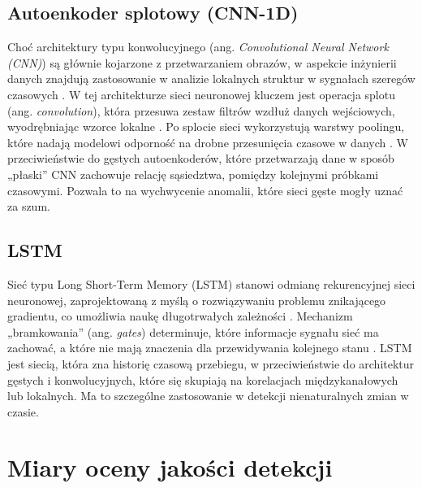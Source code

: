 \documentclass[a4paper,twoside,12pt]{book}
\begin{document}
	\subsection{Autoenkoder splotowy (CNN-1D)}
	Choć architektury typu konwolucyjnego  (ang. \textit{Convolutional Neural Network (CNN)}) są głównie kojarzone z przetwarzaniem obrazów, w aspekcie inżynierii danych znajdują zastosowanie w analizie lokalnych struktur w sygnałach szeregów czasowych \cite{kwon2018empirical}. W tej architekturze sieci neuronowej kluczem jest operacja splotu (ang. \textit{convolution}), która przesuwa zestaw filtrów wzdłuż danych wejściowych, wyodrębniając wzorce lokalne \cite{di2018using}. Po splocie sieci wykorzystują warstwy poolingu, które nadają modelowi odporność na drobne przesunięcia czasowe w danych \cite{nirthika2022pooling}. W przeciwieństwie do gęstych autoenkoderów, które przetwarzają dane w sposób „płaski” CNN zachowuje relację sąsiedztwa, pomiędzy kolejnymi próbkami czasowymi. Pozwala to na wychwycenie anomalii, które sieci gęste mogły uznać za szum. 
	
	\subsection{LSTM}
	Sieć typu Long Short-Term Memory (LSTM) stanowi odmianę rekurencyjnej sieci neuronowej, zaprojektowaną z myślą o rozwiązywaniu problemu znikającego gradientu, co umożliwia naukę długotrwałych zależności \cite{noh2021analysis}. Mechanizm „bramkowania”  (ang. \textit{gates}) determinuje, które informacje sygnału sieć ma zachować, a które nie mają znaczenia dla przewidywania kolejnego stanu \cite{xu2019multitask}. LSTM jest siecią, która zna historię czasową przebiegu, w przeciwieństwie do architektur gęstych i konwolucyjnych, które się skupiają na korelacjach międzykanałowych lub lokalnych. Ma to szczególne zastosowanie w detekcji nienaturalnych zmian w czasie. 
	
	\section{Miary oceny jakości detekcji}
	
\end{document}

